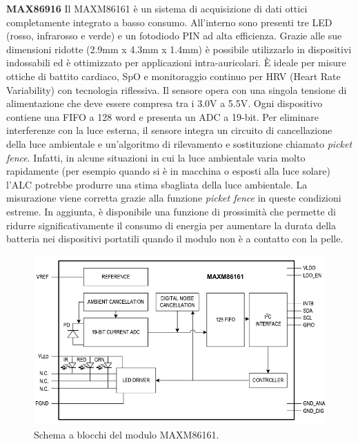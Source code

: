 \textbf{MAX86916} Il MAXM86161 è un sistema di acquisizione di dati ottici completamente integrato a basso consumo\cite{IntegratedMAXM86161}. All'interno sono presenti tre LED (rosso, infrarosso e verde) e un fotodiodo PIN ad alta efficienza. Grazie alle sue dimensioni ridotte (2.9mm x 4.3mm x 1.4mm) è possibile utilizzarlo in dispositivi indossabili ed è ottimizzato per applicazioni intra-auricolari. \`E ideale per misure ottiche di battito cardiaco, SpO e monitoraggio continuo per HRV (Heart Rate Variability) con tecnologia riflessiva. Il sensore opera con una singola tensione di alimentazione che deve essere compresa tra i 3.0V a 5.5V. Ogni dispositivo contiene una FIFO a 128 word e presenta un ADC a 19-bit. Per eliminare interferenze con la luce esterna, il sensore integra un circuito di cancellazione della luce ambientale e un'algoritmo di rilevamento e sostituzione chiamato \textit{picket fence}. Infatti, in alcune situazioni in cui la luce ambientale varia molto rapidamente (per esempio quando si è in macchina o esposti alla luce solare) l'ALC potrebbe produrre una stima sbagliata della luce ambientale. La misurazione viene corretta grazie alla funzione \textit{picket fence} in queste condizioni estreme. In aggiunta, è disponibile una funzione di prossimità che permette di ridurre significativamente il consumo di energia per aumentare la durata della batteria nei dispositivi portatili quando il modulo non è a contatto con la pelle. 
\begin{figure}[h]
	\centering
	\includegraphics[width=0.9\linewidth]{ImageFiles/Fotopletismografia/MAXM86161BlockDiagram}
	\caption{Schema a blocchi del modulo MAXM86161.}
	\label{fig:MAXM86161BlockDiagram}
\end{figure}

